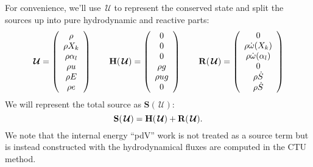 \documentclass[times,modern]{aastex63}
\newcommand{\omegadot}{\dot{\omega}}
\newcommand{\Uc}{{\,\bm{\mathcal{U}}}}
\newcommand{\Sc}{\mathbf{S}}
\newcommand{\Hb}{{\bf H}}
\newcommand{\Rb}{{\bf R}}
\begin{document}
For convenience, we'll use $\Uc$ to represent the conserved state
and split the sources up into pure hydrodynamic and reactive parts:
\begin{equation}
  \Uc = \left ( \begin{array}{c}
           \rho \\
           \rho X_k \\
           \rho \alpha_l \\
           \rho u \\
           \rho E \\
           \rho e \end{array}\right )
  \qquad
  \Hb(\Uc) = \left ( \begin{array}{c}
    0 \\
    0 \\
    0 \\
    \rho g \\
    \rho u g \\
    0 \end{array} \right )
  \qquad
  \Rb(\Uc) = \left ( \begin{array}{c}
     0 \\
     \rho \omegadot(X_k) \\
     \rho \omegadot(\alpha_l) \\
     0 \\
     \rho \dot{S} \\
     \rho \dot{S} 
  \end{array} \right )
\end{equation}
We will represent the total source as $\Sc(\Uc)$:
\begin{equation}
  \Sc(\Uc) = \Hb(\Uc) + \Rb(\Uc).
\end{equation}
We note that the internal energy ``pdV'' work is not treated as a source
term but is instead constructed with the hydrodynamical fluxes are computed in the CTU method.
\end{document}
